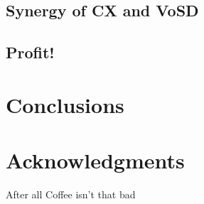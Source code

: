 \documentclass{sig-alternate}
\begin{document}
\subsection{Synergy of CX and VoSD}

\subsection{Profit!}

\section{Conclusions}

\section{Acknowledgments}

After all Coffee isn't that bad 

%

%
%
\end{document}
